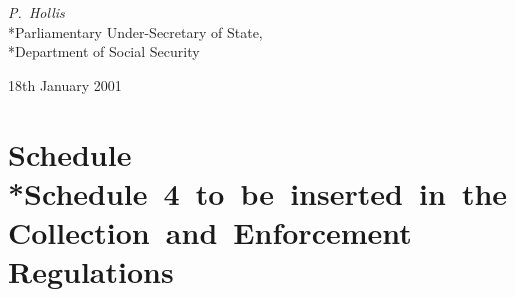 \documentclass[12pt,a4paper]{article}
\begin{document}
{\raggedleft
\emph{P.~Hollis}\\*Parliamentary Under-Secretary of State,\\*Department of Social Security

}

18th January 2001

\small

\part[Schedule --- Schedule 4 to be inserted in the Collection and Enforcement Regulations]{Schedule\\*Schedule~4~to~be~inserted~in~the Collection~and~Enforcement Regulations}

\renewcommand\parthead{--- Schedule}
\end{document}
